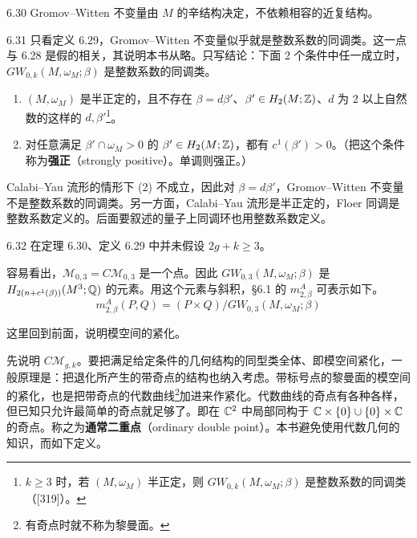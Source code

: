 \begin{theorem}{6.30}
  Gromov–Witten 不变量由 $M$ 的辛结构决定，不依赖相容的近复结构。
\end{theorem}

\begin{remark}{6.31}
  只看定义 6.29，Gromov–Witten 不变量似乎就是整数系数的同调类。这一点与 6.28 是假的相关，其说明本书从略。只写结论：下面 2 个条件中任一成立时，$GW_{0,k}(M,\omega_M;\beta)$ 是整数系数的同调类。
  \begin{enumerate}[label=(\arabic*),leftmargin=2.2em,itemsep=1pt,topsep=2pt]
    \item $(M,\omega_M)$ 是半正定的，且不存在 $\beta=d\beta'$、$\beta'\in H_2(M;\mathbb{Z})$、$d$ 为 2 以上自然数的这样的 $d,\beta'$\footnote{$k\geq3$ 时，若 $(M,\omega_M)$ 半正定，则 $GW_{0,k}(M,\omega_M;\beta)$ 是整数系数的同调类（[319]）。}。
    \item 对任意满足 $\beta'\cap\omega_M>0$ 的 $\beta'\in H_2(M;\mathbb{Z})$，都有 $c^1(\beta')>0$。（把这个条件称为\textbf{强正}（strongly positive）。单调则强正。）
  \end{enumerate}
  Calabi–Yau 流形的情形下 (2) 不成立，因此对 $\beta=d\beta'$，Gromov–Witten 不变量不是整数系数的同调类。另一方面，Calabi–Yau 流形是半正定的，Floer 同调是整数系数定义的。后面要叙述的量子上同调环也用整数系数定义。
\end{remark}

\begin{remark}{6.32}
  在定理 6.30、定义 6.29 中并未假设 $2g+k\geq3$。
\end{remark}

容易看出，$\mathcal{M}_{0,3}=C\mathcal{M}_{0,3}$ 是一个点。因此 $GW_{0,3}(M,\omega_M;\beta)$ 是 $H_{2(n+c^1(\beta))}(M^3;\mathbb{Q})$ 的元素。用这个元素与斜积，§6.1 的 $m^A_{2,\beta}$ 可表示如下。
\[
  m^A_{2,\beta}(P,Q)=(P\times Q)/GW_{0,3}(M,\omega_M;\beta)
\]

这里回到前面，说明模空间的紧化。

先说明 $C\mathcal{M}_{g,k}$。要把满足给定条件的几何结构的同型类全体、即模空间紧化，一般原理是：把退化所产生的带奇点的结构也纳入考虑。带标号点的黎曼面的模空间的紧化，也是把带奇点的代数曲线\footnote{有奇点时就不称为黎曼面。}加进来作紧化。代数曲线的奇点有各种各样，但已知只允许最简单的奇点就足够了。即在 $\mathbb{C}^2$ 中局部同构于 $\mathbb{C}\times\{0\}\cup\{0\}\times\mathbb{C}$ 的奇点。称之为\textbf{通常二重点}（ordinary double point）。本书避免使用代数几何的知识，而如下定义。

